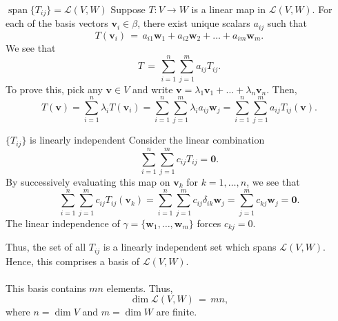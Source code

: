 \documentclass{beamer}
\def\v{\bm{v}}
\def\w{\bm{w}}
\def\L{\mathcal{L}}
\def\dim{\operatorname{dim}}
\def\spn{\operatorname{span}}
\begin{document}
        \begin{frame}{$\spn\{T_{ij}\} = \L(V, W)$}
                Suppose $T\colon V \to W$ is a linear map in $\L(V, W)$. For each of the basis vectors $\v_i \in \beta$, there exist unique
                scalars $a_{ij}$ such that
                \[
                        T(\v_i) \,=\, a_{i1}\w_1 + a_{i2}\w_2 + \dots + a_{im}\w_m.
                \]
                \pause
                We see that
                \[
                        T \,=\, \sum_{i = 1}^n \sum_{j = 1}^m a_{ij} T_{ij}.
                \]
                \pause
                To prove this, pick any $\v \in V$ and write $\v = \lambda_1\v_1 + \dots + \lambda_n\v_n$. Then,
                \[
                        T(\v) = \sum_{i = 1}^n \lambda_i T(\v_i) = \sum_{i = 1}^n \sum_{j = 1}^m \lambda_i a_{ij}\w_j
                                = \sum_{i = 1}^n \sum_{j = 1}^m a_{ij} T_{ij}(\v).
                \]
        \end{frame}

        \begin{frame}{$\{T_{ij}\}$ is linearly independent}
                Consider the linear combination 
                \[
                        \sum_{i = 1}^n \sum_{j = 1}^m c_{ij} T_{ij} = \mathbf{0}.
                \]
                \pause
                By successively evaluating this map on $\v_k$ for $k = 1, \dots, n$, we see that
                \[
                        \sum_{i = 1}^n \sum_{j = 1}^m c_{ij} T_{ij}(\v_k) = 
                        \sum_{i = 1}^n \sum_{j = 1}^m c_{ij} \delta_{ik}\w_j = \sum_{j = 1}^m c_{kj}\w_j = \mathbf{0}.
                \]
                The linear independence of $\gamma = \{\w_1, \dots, \w_m\}$ forces $c_{kj} = 0$.
        \end{frame}

        \begin{frame}
                Thus, the set of all $T_{ij}$ is a linearly independent set which spans $\L(V, W)$.
                Hence, this comprises a basis of $\L(V, W)$. \\~\\

                This basis contains $mn$ elements. Thus,
                \[
                        \dim\L(V, W) \,=\, mn,
                \]
                where $n = \dim{V}$ and $m = \dim{W}$ are finite.
        \end{frame}
\end{document}
